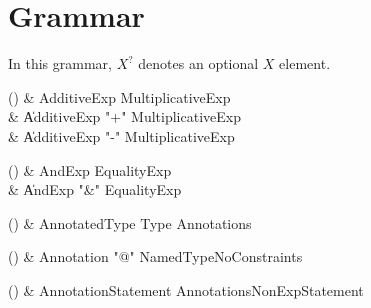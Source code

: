 \chapter{Grammar}\label{Grammar}


In this grammar, $X^?$ denotes an optional $X$ element.


\begin{bbgrammarappendix}

() & AdditiveExp \label{prod:AdditiveExp}  \: MultiplicativeExp  \\

 &    \| AdditiveExp \xcd"+" MultiplicativeExp \\
 &    \| AdditiveExp \xcd"-" MultiplicativeExp \\

\end{bbgrammarappendix}

\begin{bbgrammarappendix}

() & AndExp \label{prod:AndExp}  \: EqualityExp  \\

 &    \| AndExp \xcd"&" EqualityExp \\

\end{bbgrammarappendix}

\begin{bbgrammarappendix}

() & AnnotatedType \label{prod:AnnotatedType}  \: Type Annotations  \\


\end{bbgrammarappendix}

\begin{bbgrammarappendix}

() & Annotation \label{prod:Annotation}  \: \xcd"@" NamedTypeNoConstraints  \\


\end{bbgrammarappendix}

\begin{bbgrammarappendix}

() & AnnotationStatement \label{prod:AnnotationStatement}  \: Annotations\opt NonExpStatement  \\


\end{bbgrammarappendix}

